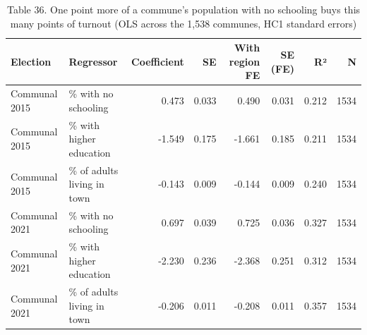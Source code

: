 \begin{table}
\caption{Table 36. One point more of a commune's population with no schooling buys this many points of turnout (OLS across the 1,538 communes, HC1 standard errors)}
\label{tab:T36_turnout_gradient}
\begin{tabular}{llrrrrrr}
\toprule
Election & Regressor & Coefficient & SE & With region FE & SE (FE) & R² & N \\
\midrule
Communal 2015 & \% with no schooling & 0.473 & 0.033 & 0.490 & 0.031 & 0.212 & 1534 \\
Communal 2015 & \% with higher education & -1.549 & 0.175 & -1.661 & 0.185 & 0.211 & 1534 \\
Communal 2015 & \% of adults living in town & -0.143 & 0.009 & -0.144 & 0.009 & 0.240 & 1534 \\
Communal 2021 & \% with no schooling & 0.697 & 0.039 & 0.725 & 0.036 & 0.327 & 1534 \\
Communal 2021 & \% with higher education & -2.230 & 0.236 & -2.368 & 0.251 & 0.312 & 1534 \\
Communal 2021 & \% of adults living in town & -0.206 & 0.011 & -0.208 & 0.011 & 0.357 & 1534 \\
\bottomrule
\end{tabular}
\end{table}
